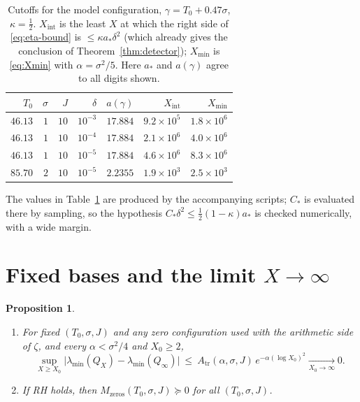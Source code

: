 \documentclass[11pt]{amsart}
\newtheorem{proposition}[theorem]{Proposition}
\theoremstyle{definition}
\theoremstyle{remark}
\newcommand{\lmin}{\lambda_{\min}}
\newcommand{\Atr}{A_{\mathrm{tr}}}
\begin{document}
\begin{table}[ht]
\centering
\caption{Cutoffs for the model configuration, $\gamma=T_0+0.47\sigma$,
$\kappa=\tfrac12$. $X_{\mathrm{int}}$ is the least $X$ at which the right side
of \eqref{eq:eta-bound} is $\le\kappa a_*\delta^2$ (which already gives
the conclusion of Theorem~\ref{thm:detector}); $X_{\min}$ is \eqref{eq:Xmin}
with $\alpha=\sigma^2/5$. Here $a_*$ and $a(\gamma)$ agree to all digits
shown.}
\label{tab:feasibility}
\begin{tabular}{@{}rrrrrrr@{}}
\toprule
$T_0$ & $\sigma$ & $J$ & $\delta$ & $a(\gamma)$ & $X_{\mathrm{int}}$ & $X_{\min}$ \\
\midrule
$46.13$ & $1$ & $10$ & $10^{-3}$ & $17.884$ & $9.2\times10^{5}$ & $1.8\times10^{6}$ \\
$46.13$ & $1$ & $10$ & $10^{-4}$ & $17.884$ & $2.1\times10^{6}$ & $4.0\times10^{6}$ \\
$46.13$ & $1$ & $10$ & $10^{-5}$ & $17.884$ & $4.6\times10^{6}$ & $8.3\times10^{6}$ \\
$85.70$ & $2$ & $10$ & $10^{-5}$ & $2.2355$ & $1.9\times10^{3}$ & $2.5\times10^{3}$ \\
\bottomrule
\end{tabular}
\end{table}

The values in Table~\ref{tab:feasibility} are produced by the accompanying
scripts; $C_*$ is evaluated there by sampling, so the hypothesis
$C_*\delta^2\le\frac12(1-\kappa)a_*$ is checked numerically, with a wide
margin.

\section{Fixed bases and the limit \texorpdfstring{$X\to\infty$}{X to infinity}}\label{sec:dichotomy}

\begin{proposition}\label{prop:dichotomy}
\leavevmode
\begin{enumerate}[label=\textup{(\alph*)}]
\item For fixed $(T_0,\sigma,J)$ and any zero configuration used with the
arithmetic side of $\zeta$, and every $\alpha<\sigma^2/4$ and $X_0\ge2$,
\begin{equation}\label{eq:uniform}
  \sup_{X\ge X_0}\bigl|\lmin(Q_X)-\lmin(Q_\infty)\bigr|\ \le\ \Atr(\alpha,\sigma,J)\,e^{-\alpha(\log X_0)^2}\xrightarrow[X_0\to\infty]{}0 .
\end{equation}
\item If RH holds, then $M_{\mathrm{zeros}}(T_0,\sigma,J)\succeq0$ for all
$(T_0,\sigma,J)$.
\end{enumerate}
\end{proposition}
\end{document}
